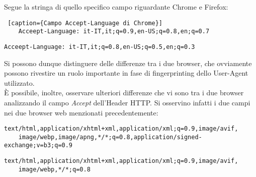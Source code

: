 Segue la stringa di quello specifico campo riguardante Chrome e Firefox:

\begin{lstlisting} [caption={Campo Accept-Language di Chrome}]
	Acceept-Language: it-IT,it;q=0.9,en-US;q=0.8,en;q=0.7
\end{lstlisting}

\begin{lstlisting}[caption={Campo Accept-Language di Firefox}]
	Acceept-Language: it-IT,it;q=0.8,en-US;q=0.5,en;q=0.3
\end{lstlisting}

Si possono dunque distinguere delle differenze tra i due browser, che ovviamente possono rivestire un ruolo importante in fase di fingerprinting dello User-Agent utilizzato.
\\

È possibile, inoltre, osservare ulteriori differenze che vi sono tra i due browser analizzando il campo \textit{Accept} dell'Header HTTP. Si osservino infatti i due campi nei due browser web menzionati precedentemente:
\\


\begin{lstlisting}[caption={Campo \textit{Accept} di richiesta GET di Chrome}]
	text/html,application/xhtml+xml,application/xml;q=0.9,image/avif,
	image/webp,image/apng,*/*;q=0.8,application/signed-exchange;v=b3;q=0.9
\end{lstlisting}

\begin{lstlisting}[caption={Campo \textit{Accept} di richiesta GET di Firefox}]
	text/html,application/xhtml+xml,application/xml;q=0.9,image/avif,
	image/webp,*/*;q=0.8
\end{lstlisting}
















